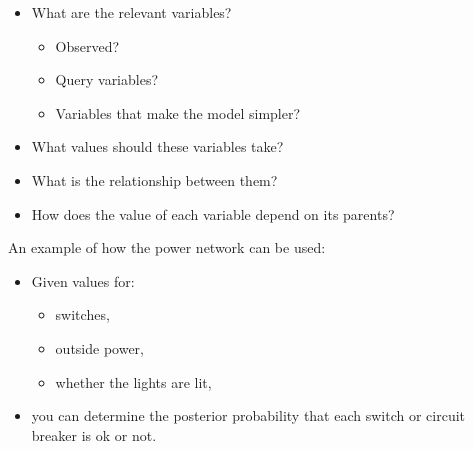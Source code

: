 \documentclass[12pt]{beamer} %
\begin{document}
\begin{slide}
\begin{itemize}
\item What are the relevant variables?
\begin{itemize}
\item Observed?
\item Query variables?
\item Variables that make the model simpler?
\end{itemize}
\item What values should these variables take?
\item What is the relationship between them?
\item How does the value of each variable depend on its parents?
\end{itemize}
\end{slide}

\begin{slide}
An example of how the power network can be used:
\begin{itemize}
\item Given values for:
  \begin{itemize}
    \item switches,
    \item outside power,
    \item whether the lights are lit,
  \end{itemize}
\item you can determine the posterior probability that each switch or circuit breaker is ok or not.
\end{itemize}
\end{slide}
\end{document}
